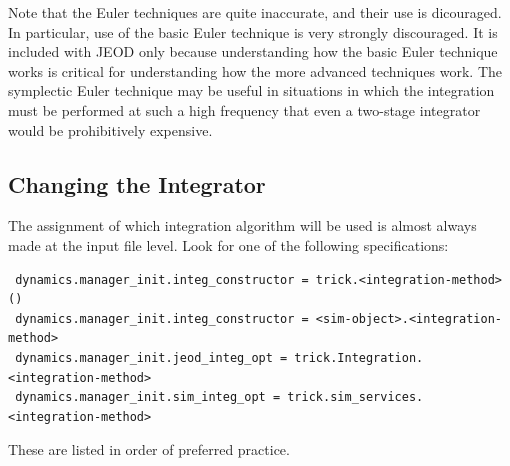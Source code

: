 Note that the Euler techniques are quite inaccurate, and their use is 
dicouraged.  In particular, use of the basic Euler technique is very strongly 
discouraged. It is included with JEOD only because understanding how the basic
Euler technique works is critical for understanding how the more advanced
techniques work.  The symplectic Euler technique may be useful in situations 
in which the integration must be
performed at such a high frequency that even a two-stage integrator would be 
prohibitively expensive. 


\subsection{Changing the Integrator}
The assignment of which integration algorithm will be used is almost always 
made at the input file level.  Look for one of the following
specifications:
\begin{verbatim}
 dynamics.manager_init.integ_constructor = trick.<integration-method>()
 dynamics.manager_init.integ_constructor = <sim-object>.<integration-method>
 dynamics.manager_init.jeod_integ_opt = trick.Integration.<integration-method>
 dynamics.manager_init.sim_integ_opt = trick.sim_services.<integration-method>
\end{verbatim}

These are listed in order of preferred practice.

